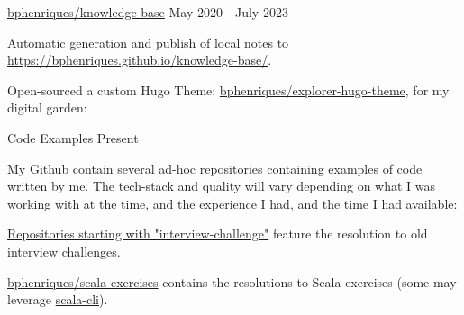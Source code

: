 \begin{cventries}
  \openSourceEntry
    {\href{https://github.com/bphenriques/knowledge-base}{bphenriques/knowledge-base}}
    {May 2020 - July 2023}
    {    
    \begin{openSourceItems}
        \item Automatic generation and publish of local notes to \href{https://bphenriques.github.io/knowledge-base/}{https://bphenriques.github.io/knowledge-base/}.
        \item Open-sourced a custom Hugo Theme: \href{https://github.com/bphenriques/explorer-hugo-theme}{bphenriques/explorer-hugo-theme}, for my digital garden:
    \end{openSourceItems}
    \vspace{4mm}
    }

  \vspace{2mm}

    
\openSourceEntry
    {Code Examples}
    {Present}
    {   
    \begin{openSourceDescription}
    My Github contain several ad-hoc repositories containing examples of code written by me. The tech-stack and quality will vary depending on what I was working with at the time, and the experience I had, and the time I had available:
    \end{openSourceDescription}
    \vspace{8mm}
    \begin{openSourceItems}
        \item \href{https://github.com/bphenriques?tab=repositories&q=interview-challenge&type=&language=&sort=}{Repositories starting with "interview-challenge"} feature the resolution to old interview challenges.
        \item \href{https://github.com/bphenriques/scala-exercises}{bphenriques/scala-exercises} contains the resolutions to Scala exercises (some may leverage \href{https://scala-cli.virtuslab.org/}{scala-cli}).
    \end{openSourceItems}
    \vspace{4mm}
    }


\end{cventries}
